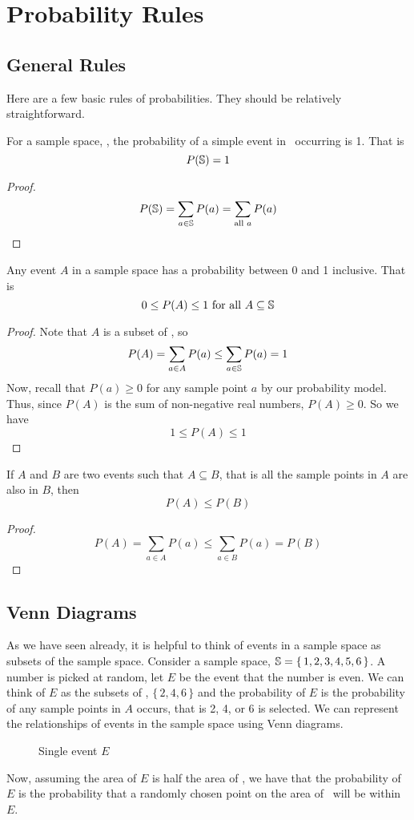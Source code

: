 \chapter{Probability Rules}
\section{General Rules}
Here are a few basic rules of probabilities. They should be relatively straightforward.
\begin{theorem}
For a sample space, \sS, the probability of a simple event in \sS~occurring is 1. That is
\[
    P(\mathbb{S}) = 1
\]
\end{theorem}
\begin{proof}
\[
    P(\mathbb{S}) = \sum_{a \in \mathbb{S}} P(a) = \sum_{\text{all } a} P(a)
\]
\end{proof}
\begin{theorem}
Any event $A$ in a sample space has a probability between 0 and 1 inclusive. That is
\[
    0 \leq P(A) \leq 1 \text{ for }\text{all } A\subseteq\mathbb{S}
\]
\end{theorem}
\begin{proof}
Note that $A$ is a subset of \sS, so
\[
    P(A) = \sum_{a \in A} P(a) \leq \sum_{a \in \mathbb{S}} P(a) = 1
\]
Now, recall that $P(a) \geq 0$ for any sample point $a$ by our probability model. Thus, since $P(A)$ is the sum of non-negative real numbers, $P(A) \geq 0$. So we have
\[
    1 \leq P(A) \leq 1
\]
\end{proof}
\begin{theorem}
If $A$ and $B$ are two events such that $A \subseteq B$, that is all the sample points in $A$ are also in $B$, then 
\[
    P(A) \leq P(B)
\]
\end{theorem}
\begin{proof}
\[
    P(A) = \sum_{a \in A} P(a) \leq \sum_{a \in B} P(a) = P(B)
\]
\end{proof}
\section{Venn Diagrams}
As we have seen already, it is helpful to think of events in a sample space as subsets of the sample space. Consider a sample space, $\mathbb{S} = \{\, 1,2,3,4,5,6 \,\}$. A number is picked at random, let $E$ be the event that the number is even. We can think of $E$ as the subsets of \sS, $\{\, 2,4,6 \,\}$ and the probability of $E$ is the probability of any sample points in $A$ occurs, that is 2, 4, or 6 is selected. We can represent the relationships of events in the sample space using Venn diagrams.
\par\smallskip
\begin{figure}[h]
\centering
{}
\caption{Single event $E$} \label{fig:Single event}
\end{figure}
Now, assuming the area of $E$ is half the area of \sS, we have that the probability of $E$ is the probability that a randomly chosen point on the area of \sS~will be within $E$.

